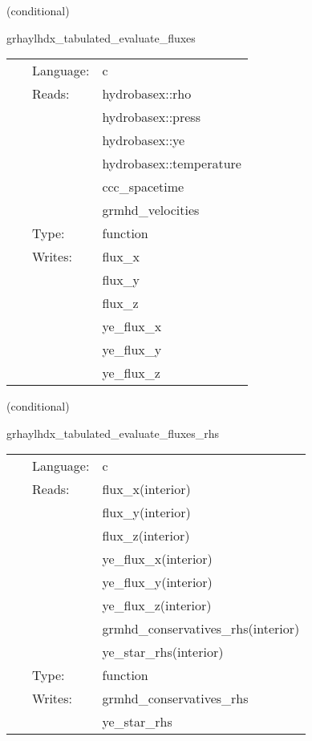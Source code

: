 \vspace{5mm}

   (conditional) 

\hspace{5mm} grhaylhdx\_tabulated\_evaluate\_fluxes 

\hspace{5mm}{\it tabulated version of grhaylhdx\_evaluate\_fluxes } 


\hspace{5mm}

 \begin{tabular*}{160mm}{cll} 
~ & Language:  & c \\ 
~ & Reads:  & hydrobasex::rho \\ 
~& ~ &hydrobasex::press\\ 
~& ~ &hydrobasex::ye\\ 
~& ~ &hydrobasex::temperature\\ 
~& ~ &ccc\_spacetime\\ 
~& ~ &grmhd\_velocities\\ 
~ & Type:  & function \\ 
~ & Writes:  & flux\_x \\ 
~& ~ &flux\_y\\ 
~& ~ &flux\_z\\ 
~& ~ &ye\_flux\_x\\ 
~& ~ &ye\_flux\_y\\ 
~& ~ &ye\_flux\_z\\ 
\end{tabular*} 


\vspace{5mm}

   (conditional) 

\hspace{5mm} grhaylhdx\_tabulated\_evaluate\_fluxes\_rhs 

\hspace{5mm}{\it tabulated version of grhaylhdx\_evaluate\_fluxes\_rhs } 


\hspace{5mm}

 \begin{tabular*}{160mm}{cll} 
~ & Language:  & c \\ 
~ & Reads:  & flux\_x(interior) \\ 
~& ~ &flux\_y(interior)\\ 
~& ~ &flux\_z(interior)\\ 
~& ~ &ye\_flux\_x(interior)\\ 
~& ~ &ye\_flux\_y(interior)\\ 
~& ~ &ye\_flux\_z(interior)\\ 
~& ~ &grmhd\_conservatives\_rhs(interior)\\ 
~& ~ &ye\_star\_rhs(interior)\\ 
~ & Type:  & function \\ 
~ & Writes:  & grmhd\_conservatives\_rhs \\ 
~& ~ &ye\_star\_rhs\\ 
\end{tabular*} 


